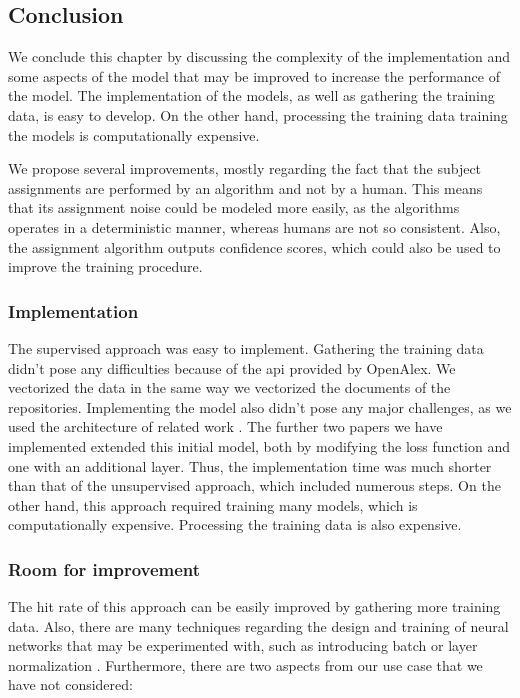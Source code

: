 \subsection{Conclusion} \label{supervised_approach_conclusion}

We conclude this chapter by discussing the complexity of the implementation and some aspects of the model that may be improved to increase the performance of the model. The implementation of the models, as well as gathering the training data, is easy to develop. On the other hand, processing the training data training the models is computationally expensive.

We propose several improvements, mostly regarding the fact that the subject assignments are performed by an algorithm and not by a human. This means that its assignment noise could be modeled more easily, as the algorithms operates in a deterministic manner, whereas humans are not so consistent. Also, the assignment algorithm outputs confidence scores, which could also be used to improve the training procedure.

\subsubsection{Implementation}

The supervised approach was easy to implement. Gathering the training data didn't pose any difficulties because of the \acrshort{api} provided by OpenAlex. We vectorized the data in the same way we vectorized the documents of the repositories. Implementing the model also didn't pose any major challenges, as we used the architecture of related work \cite{gargiulo2019deep}. The further two papers we have implemented extended this initial model, both by modifying the loss function and one with an additional layer. Thus, the implementation time was much shorter than that of the unsupervised approach, which included numerous steps. On the other hand, this approach required training many models, which is computationally expensive. Processing the training data is also expensive.

\subsubsection{Room for improvement}

The hit rate of this approach can be easily improved by gathering more training data. Also, there are many techniques regarding the design and training of neural networks that may be experimented with, such as introducing batch or layer normalization \cite{ba2016layer}. Furthermore, there are two aspects from our use case that we have not considered:


